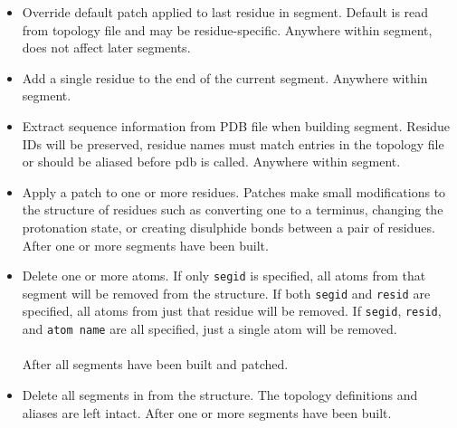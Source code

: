\begin{itemize}
\item {}
{Override default patch applied to last residue in segment.
Default is read from topology file and may be residue-specific.}
{}
{Anywhere within segment, does not affect later segments.}

\item {}
{Add a single residue to the end of the current segment.}
{
}
{Anywhere within segment.}

\item {}
{Extract sequence information from PDB file when building segment.
Residue IDs will be preserved, residue names must match entries in
the topology file or should be aliased before pdb is called.}
{}
{Anywhere within segment.}

\item {}
{Apply a patch to one or more residues.  Patches make small modifications to
the structure of residues such as converting one to a terminus, changing the
protonation state, or creating disulphide bonds between a pair of residues.}
{\\
}
{After one or more segments have been built.}

\item {}
{Delete one or more atoms.  If only {\tt segid} is specified, all atoms from
that segment will be removed from the structure.  If both {\tt segid} and
{\tt resid} are specified, all atoms from just that residue will be removed.
If {\tt segid}, {\tt resid}, and {\tt atom name} are all specified, just a
single atom will be removed.}
{\\
\\
}
{After all segments have been built and patched.}

\item {}
{Delete all segments in from the structure.  The topology definitions and 
aliases are left intact.}
{}
{After one or more segments have been built.}


\end{itemize}
